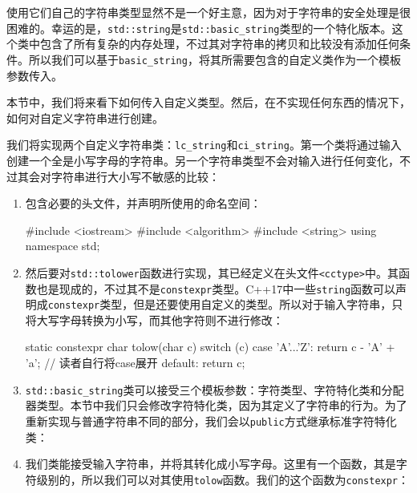使用它们自己的字符串类型显然不是一个好主意，因为对于字符串的安全处理是很困难的。幸运的是，\texttt{std::string}是\texttt{std::basic\_string}类型的一个特化版本。这个类中包含了所有复杂的内存处理，不过其对字符串的拷贝和比较没有添加任何条件。所以我们可以基于\texttt{basic\_string}，将其所需要包含的自定义类作为一个模板参数传入。

本节中，我们将来看下如何传入自定义类型。然后，在不实现任何东西的情况下，如何对自定义字符串进行创建。


我们将实现两个自定义字符串类：\texttt{lc\_string}和\texttt{ci\_string}。第一个类将通过输入创建一个全是小写字母的字符串。另一个字符串类型不会对输入进行任何变化，不过其会对字符串进行大小写不敏感的比较：

\begin{enumerate}
\item 包含必要的头文件，并声明所使用的命名空间：

\begin{codebox}[cpp]
#include <iostream>
#include <algorithm>
#include <string>
using namespace std;
\end{codebox}

\item 然后要对\texttt{std::tolower}函数进行实现，其已经定义在头文件\texttt{<cctype>}中。其函数也是现成的，不过其不是\texttt{constexpr}类型。C++17中一些\texttt{string}函数可以声明成\texttt{constexpr}类型，但是还要使用自定义的类型。所以对于输入字符串，只将大写字母转换为小写，而其他字符则不进行修改：

\begin{codebox}[cpp]
static constexpr char tolow(char c) {
    switch (c) {
    case 'A'...'Z': return c - 'A' + 'a'; // 读者自行将case展开
    default:        return c;
    }
}
\end{codebox}

\item \texttt{std::basic\_string}类可以接受三个模板参数：字符类型、字符特化类和分配器类型。本节中我们只会修改字符特化类，因为其定义了字符串的行为。为了重新实现与普通字符串不同的部分，我们会以\texttt{public}方式继承标准字符特化类：

\begin{codebox}[cpp]
class lc_traits : public char_traits<char> {
public:
\end{codebox}

\item 我们类能接受输入字符串，并将其转化成小写字母。这里有一个函数，其是字符级别的，所以我们可以对其使用\texttt{tolow}函数。我们的这个函数为\texttt{constexpr}：


\end{enumerate}
